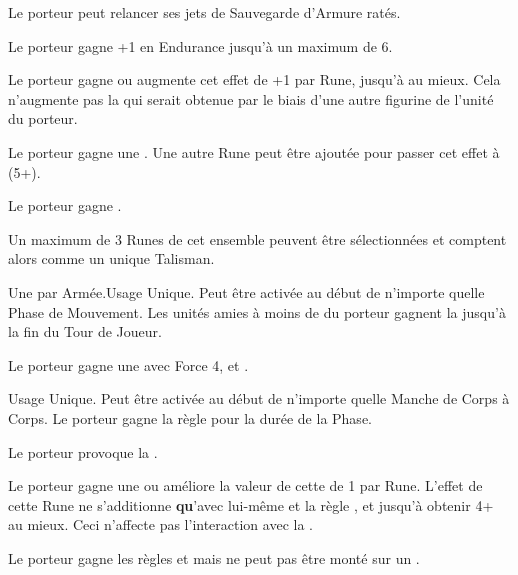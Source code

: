 \begin{multicols}{2}
Le porteur peut relancer ses jets de Sauvegarde d'Armure ratés.

Le porteur gagne +1 en Endurance jusqu'à un maximum de 6.

Le porteur gagne  ou augmente cet effet de +1 par Rune, jusqu'à  au mieux. Cela n'augmente pas la \magicresistance{} qui serait obtenue par le biais d'une autre figurine de l'unité du porteur.

 Le porteur gagne une . Une autre Rune peut être ajoutée pour passer cet effet à (5+).

 Le porteur gagne .

\endpricelist

\columnbreak
\subtitle{Runes de Talisman}\vspace{5pt}

Un maximum de 3 Runes de cet ensemble peuvent être sélectionnées et comptent alors comme un unique Talisman.

\startpricelist

Une par Armée.\newline Usage Unique. Peut être activée au début de n'importe quelle Phase de Mouvement. Les unités amies à moins de  du porteur gagnent la \devastatingcharge{} jusqu'à la fin du Tour de Joueur.

Le porteur gagne une \breathweapon{} avec Force 4, \flamingattacks{} et \magicalattacks{}.

Usage Unique. Peut être activée au début de n'importe quelle Manche de Corps à Corps. Le porteur gagne la règle \stubborn{} pour la durée de la Phase.

Le porteur provoque la \fear{}.

Le porteur gagne une  ou améliore la valeur de cette \wardsave{} de 1 par Rune. L'effet de cette Rune ne s'additionne \textbf{qu}'avec lui-même et la règle \shieldwall{}, et jusqu'à obtenir 4+ au mieux. Ceci n'affecte pas l'interaction avec la \magicresistance{}.

Le porteur gagne les règles \vanguard{} et \scout{} mais ne peut pas être monté sur un \warthrone{}.


\end{multicols}
